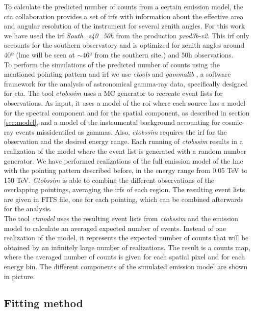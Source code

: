 \documentclass[main.tex]{subfiles}
\begin{document}
To calculate the predicted number of counts from a certain emission model, the \gls{cta} collaboration provides a set of \glspl{irf} \cite{CTAPerformance} with information about the effective area and angular resolution of the instrument for several zenith angles. For this work we have used the \gls{irf} \textit{South\_z40\_50h} from the production \textit{prod3b-v2}. This \gls{irf} only accounts for the southern observatory and is optimized for zenith angles around 40º (\gls{lmc} will be seen at $\sim 46$º from the southern site.) and 50h observations. \\
To perform the simulations of the predicted number of counts using the mentioned pointing pattern and \gls{irf} we use \textit{ctools} and \textit{gammalib} \cite{2016Actools}, a software framework for the analysis of astronomical gamma-ray data, specifically designed for \gls{cta}. The tool \textit{ctobssim} uses a MC generator to recreate event lists for observations. As input, it uses a model of the \gls{roi} where each source has a model for the spectral component and for the spatial component, as described in section \ref{sec:model}, and a model of the instrumental background accounting for cosmic-ray events missidentifed as gammas.
Also, \textit{ctobssim} requires the \gls{irf} for the observation and the desired energy range. Each running of \textit{ctobssim} results in a realization of the model where the event list is generated with a random number generator. We have performed realizations of the full emission model of the \gls{lmc} with the pointing pattern described before, in the energy range from 0.05 TeV to 150 TeV. \textit{Ctobssim} is able to combine the different observations of the overlapping pointings, averaging the \glspl{irf} of each region. The resulting event lists are given in FITS file, one for each pointing, which can be combined afterwards for the analysis.\\
The tool \textit{ctmodel} uses the resulting event lists from \textit{ctobssim} and the emission model to calculate an averaged expected number of events. Instead of one realization of the model, it represents the expected number of counts that will be obtained by an infinitely large number of realizations. The result is a counts map, where the averaged number of counts is given for each spatial pixel and for each energy bin. 
The different components of the simulated emission model are shown in picture.
    
\subsection{Fitting method}
\end{document}
